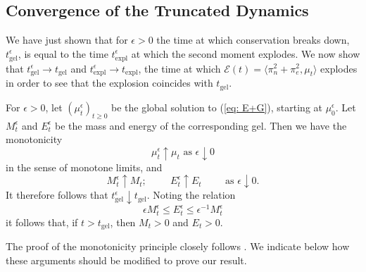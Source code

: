 \subsection{Convergence of the Truncated Dynamics}
We have just shown that for $\epsilon > 0$ the time at which conservation breaks down, $t_\mathrm{gel}^\epsilon$, is equal to the time $t_\mathrm{expl}^\epsilon$ at which the second moment explodes.
We now show that $t_\mathrm{gel}^\epsilon \rightarrow t_\mathrm{gel}$ and $t_\mathrm{expl}^\epsilon \rightarrow t_\mathrm{expl}$, the time at which $\mathcal{E}(t)=\langle \pi_n^2+\pi_e^2, \mu_t\rangle$ explodes in order to see that the explosion coincides with $t_\mathrm{gel}$.
\begin{lemma}\label{lemma: connecting mu-epsilon and mu}
    For $\epsilon>0$, let $(\mu^\epsilon_t)_{t\geq 0}$ be the global solution to (\ref{eq: E+G}), starting at $\mu_0^\epsilon.$ Let $M^\epsilon_t$ and $E^\epsilon_t$ be the mass and energy of the corresponding gel. Then we have  the monotonicity \begin{equation}\label{eq: monontonicity for muepsilont}
        \mu^\epsilon_t \uparrow \mu_t \text{ as }\epsilon\downarrow 0
    \end{equation} in the sense of monotone limits, and\begin{equation} \label{eq: monotonicity for gel data}
        M^\epsilon_t \uparrow M_t; \hspace{1cm} E^\epsilon_t \uparrow E_t \hspace{1cm} \text{as }\epsilon\downarrow 0.
    \end{equation}
It therefore follows that $t^\epsilon_\mathrm{gel}\downarrow t_\mathrm{gel}$. Noting the relation \begin{equation}\label{eq: Mepsilon and Eepsilon}
        \epsilon M^\epsilon_t \leq E^\epsilon_t \leq \epsilon^{-1}M^\epsilon_t
    \end{equation}it follows that, if $t>t_\mathrm{gel}$, then $M_t >0$ and $E_t>0$.
\end{lemma}
The proof of the monotonicity principle closely follows \cite[Propositions 2.4,  2.7]{N00}. We indicate below how these arguments should be modified to prove our result.
